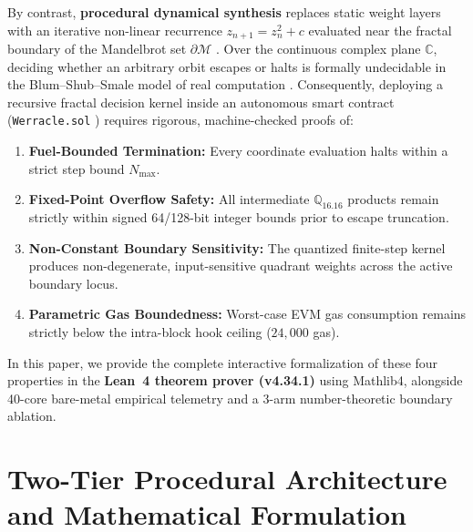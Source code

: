 \documentclass[10pt,a4paper]{article}
\begin{document}
By contrast, \textbf{procedural dynamical synthesis} replaces static weight layers with an iterative non-linear recurrence $z_{n+1} = z_n^2 + c$ evaluated near the fractal boundary of the Mandelbrot set $\partial\mathcal{M}$ \cite{dagli2026mandelbrot, dagli2026oed, dagli2026werr}. Over the continuous complex plane $\mathbb{C}$, deciding whether an arbitrary orbit escapes or halts is formally undecidable in the Blum--Shub--Smale model of real computation \cite{blum1989}. Consequently, deploying a recursive fractal decision kernel inside an autonomous smart contract (\texttt{Werracle.sol} \cite{dagli2026werracle}) requires rigorous, machine-checked proofs of:
\begin{enumerate}[leftmargin=1.6em,itemsep=1pt,topsep=2pt]
    \item \textbf{Fuel-Bounded Termination:} Every coordinate evaluation halts within a strict step bound $N_{\max}$.
    \item \textbf{Fixed-Point Overflow Safety:} All intermediate $\mathbb{Q}_{16.16}$ products remain strictly within signed 64/128-bit integer bounds prior to escape truncation.
    \item \textbf{Non-Constant Boundary Sensitivity:} The quantized finite-step kernel produces non-degenerate, input-sensitive quadrant weights across the active boundary locus.
    \item \textbf{Parametric Gas Boundedness:} Worst-case EVM gas consumption remains strictly below the intra-block hook ceiling ($24,000$ gas).
\end{enumerate}

In this paper, we provide the complete interactive formalization of these four properties in the \textbf{Lean~4 theorem prover (v4.34.1)} \cite{moura2021} using Mathlib4, alongside 40-core bare-metal empirical telemetry and a 3-arm number-theoretic boundary ablation.

\section{Two-Tier Procedural Architecture and Mathematical Formulation}
\end{document}
